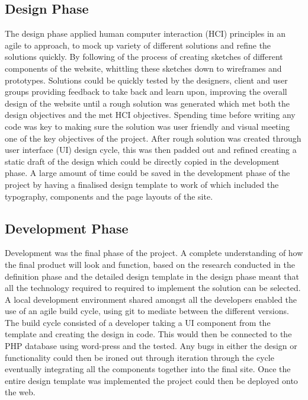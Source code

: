 \documentclass[fontsize=11pt]{extarticle}
\numberwithin{figure}{section} %
\numberwithin{table}{section}%
\begin{document}
\hypertarget{design-phase}{%
\subsection{Design Phase}\label{design-phase}}

The design phase applied human computer interaction (HCI) principles in
an agile to approach, to mock up variety of different solutions and
refine the solutions quickly. By following of the process of creating
sketches of different components of the website, whittling these
sketches down to wireframes and prototypes. Solutions could be quickly
tested by the designers, client and user groups providing feedback to
take back and learn upon, improving the overall design of the website
until a rough solution was generated which met both the design
objectives and the met HCI objectives. Spending time before writing any
code was key to making sure the solution was user friendly and visual
meeting one of the key objectives of the project. After rough solution
was created through user interface (UI) design cycle, this was then
padded out and refined creating a static draft of the design which could
be directly copied in the development phase. A large amount of time
could be saved in the development phase of the project by having a
finalised design template to work of which included the typography,
components and the page layouts of the site.

\hypertarget{development-phase}{%
\subsection{Development Phase}\label{development-phase}}

Development was the final phase of the project. A complete understanding
of how the final product will look and function, based on the research
conducted in the definition phase and the detailed design template in
the design phase meant that all the technology required to required to
implement the solution can be selected. A local development environment
shared amongst all the developers enabled the use of an agile build
cycle, using git to mediate between the different versions. The build
cycle consisted of a developer taking a UI component from the template
and creating the design in code. This would then be connected to the PHP
database using word-press and the tested. Any bugs in either the design
or functionality could then be ironed out through iteration through the
cycle eventually integrating all the components together into the final
site. Once the entire design template was implemented the project could
then be deployed onto the web.
\end{document}
